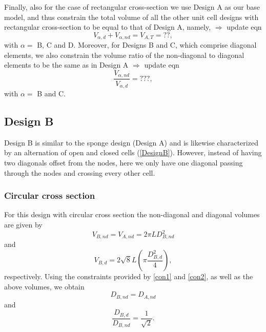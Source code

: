 \documentclass[10pt,twoside]{fernandes_supp}
\newcommand{\KB}[1]{\noindent\color{blue}$\Longrightarrow$ #1\normalcolor}
\begin{document}
Finally, also for the case of rectangular cross-section we use Design A as our base model, and thus constrain the total volume of all the other unit cell designs with rectangular cross-section to be equal to that of Design A, namely, \KB{update eqn}
\begin{equation}\label{con1R}
V_{\alpha,d}+V_{\alpha,nd}={V}_{A,T}= ??,
\end{equation}
with $\alpha=$ B, C and D.
Moreover, for Designs B and C, which comprise diagonal elements, we also  constrain the volume ratio of the non-diagonal to diagonal elements to be the same as in Design A \KB{update eqn}
\begin{equation}\label{con2R}
\frac{V_{\alpha,nd}}{V_{\alpha,d}}=???,
\end{equation}
with $\alpha=$ B and C.

\subsection{Design B}
Design B is similar to the sponge design (Design A) and is likewise characterized by an alternation of open and closed cells (\cref{DesignB}). However, instead of having two diagonals offset from the nodes, here we only have one diagonal passing through the nodes and crossing every other cell. 

\subsubsection{Circular cross section}
For this design with circular cross section the non-diagonal and diagonal volumes are given by
\begin{equation}
V_{B,nd}=V_{A,nd}=2\pi L D_{B,nd}^2
\end{equation}
and
\begin{equation}
V_{B,d}=2\sqrt{8} L \left(\pi \frac{{D}_{B,d}^2}{4}\right),
\end{equation}
respectively.
Using the constraints provided by \cref{con1} and \cref{con2}, as well as the above volumes, we  obtain 
\begin{equation}
{{D}_{B,nd}}={{D}_{A,nd}}
\end{equation}
and
\begin{equation}
\frac{{D}_{B,d}}{{D}_{B,nd}}=\frac{1}{\sqrt{2}}.
\end{equation}
\end{document}
